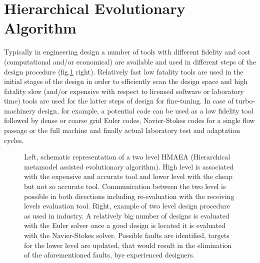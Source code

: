 \section{Hierarchical Evolutionary Algorithm}
Typically in engineering design a number of tools with different fidelity and cost (computational and/or economical) are available and used in different steps of the design procedure (fig.\ref{HMAEA} right). Relatively fast low fatality tools are used in the initial stages of the design in order to efficiently scan the design space and high fatality slow (and/or expensive with respect to licensed software or laboratory time) tools are used for the latter steps of design for fine-tuning. In case of turbo-machinery design, for example, a potential code can be used as a low fidelity tool followed by dense or coarse grid Euler codes, Navier-Stokes codes for a single flow passage or the full machine and finally actual laboratory test and adaptation cycles.    


\begin{figure}[h!]
\begin{minipage}[b]{1.0\linewidth}
 \centering
\end{minipage}
\caption{Left, schematic representation of a two level HMAEA (Hierarchical metamodel assisted evolutionary algorithm). High level is associated with the expensive and accurate tool and lower level with the cheap but not so accurate tool. Communication between the two level is possible in both directions including re-evaluation with the receiving levels evaluation tool. Right, example of two level design procedure as used in industry. A relatively big number of designs is evaluated with the Euler solver once a good design is located it is evaluated with the Navier-Stokes solver. Possible faults are identified, targets for the lower level are updated, that would result in the  elimination of the aforementioned faults, bye experienced designers.}
\label{HMAEA}
\end{figure} 
 
